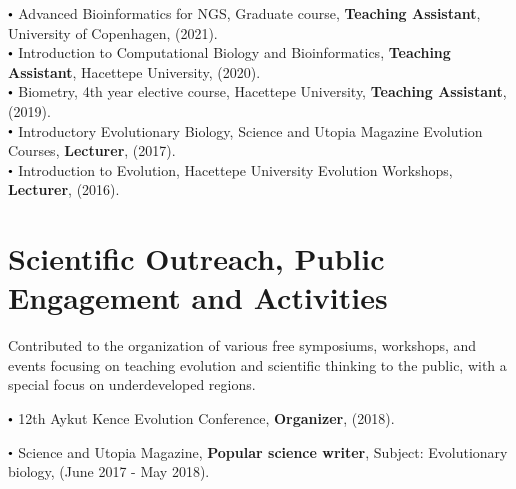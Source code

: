 \documentclass[letterpaper,10.5pt]{article}
\newcommand\sbullet[1][.5]{\mathbin{\vcenter{\hbox{\scalebox{#1}{$\bullet$}}}}}
\begin{document}
$\sbullet[.6]$ \hspace{0.74cm}  Advanced Bioinformatics for NGS, Graduate course, \textbf{Teaching Assistant}, University of Copenhagen, (2021). \\
$\sbullet[.6]$ \hspace{0.74cm}  Introduction to Computational Biology and Bioinformatics, \textbf{Teaching Assistant}, Hacettepe University, (2020).\\
$\sbullet[.6]$ \hspace{0.74cm}  Biometry, 4th year elective course, Hacettepe University, \textbf{Teaching Assistant}, (2019). \\
$\sbullet[.6]$ \hspace{0.74cm}  Introductory Evolutionary Biology, Science and Utopia Magazine Evolution Courses, \textbf{Lecturer}, (2017). \\
$\sbullet[.6]$ \hspace{0.74cm}  Introduction to Evolution, Hacettepe University Evolution Workshops, \textbf{Lecturer}, (2016). \\



\section{Scientific Outreach, Public Engagement and Activities}

Contributed to the organization of various free symposiums, workshops, and events focusing on teaching evolution and scientific thinking to the public, with a special focus on underdeveloped regions. \\

\smallskip

$\sbullet[.6]$ \hspace{0.74cm}  12th Aykut Kence Evolution Conference, \textbf{Organizer}, (2018). \\
\smallskip

$\sbullet[.6]$ \hspace{0.74cm}  Science and Utopia Magazine, \textbf{Popular science writer}, Subject: Evolutionary biology, (June 2017 - May 2018). \\
\smallskip
\end{document}
